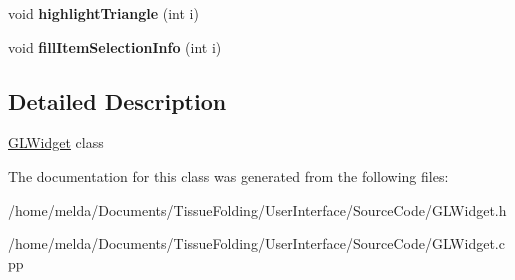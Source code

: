 \begin{DoxyCompactItemize}
\item 
\hypertarget{classGLWidget_aa3bfac7b767b04f2dd0685692b4f5aa2}{}void {\bfseries highlight\+Triangle} (int i)\label{classGLWidget_aa3bfac7b767b04f2dd0685692b4f5aa2}

\item 
\hypertarget{classGLWidget_af2ce64f5342b0a42f9460a9173b7eaf7}{}void {\bfseries fill\+Item\+Selection\+Info} (int i)\label{classGLWidget_af2ce64f5342b0a42f9460a9173b7eaf7}

\end{DoxyCompactItemize}


\subsection{Detailed Description}
\hyperlink{classGLWidget}{G\+L\+Widget} class 

The documentation for this class was generated from the following files\+:\begin{DoxyCompactItemize}
\item 
/home/melda/\+Documents/\+Tissue\+Folding/\+User\+Interface/\+Source\+Code/G\+L\+Widget.\+h\item 
/home/melda/\+Documents/\+Tissue\+Folding/\+User\+Interface/\+Source\+Code/G\+L\+Widget.\+cpp\end{DoxyCompactItemize}

